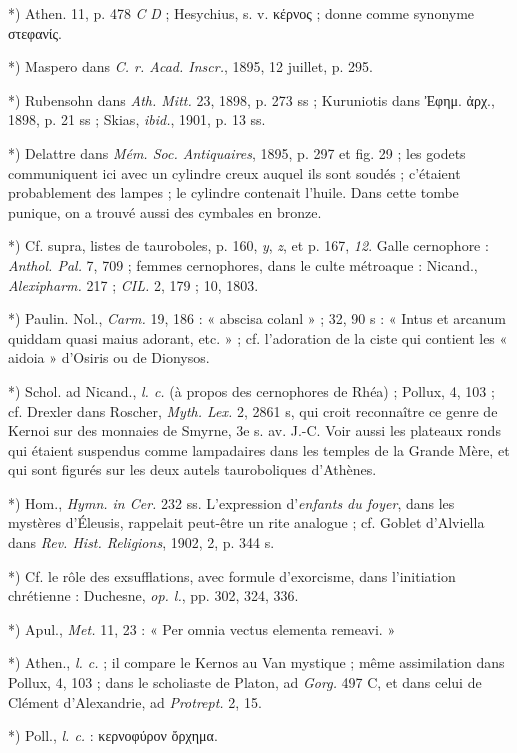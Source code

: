 \documentclass[a4paper, 11pt, oneside, polutonikogreek, french]{article}
\begin{document}
*) Athen. 11, p. 478 \emph{C} \emph{D} ; Hesychius, s. v. κέρνος ; donne comme synonyme στεφανίς.

*) Maspero dans \emph{C. r. Acad. Inscr.}, 1895, 12 juillet, p. 295.

*) Rubensohn dans \emph{Ath. Mitt.} 23, 1898, p. 273 ss ; Kuruniotis dans Ἐφημ. ἀρχ., 1898, p. 21 ss ; Skias, \emph{ibid.}, 1901, p. 13 ss.

*) Delattre dans \emph{Mém. Soc. Antiquaires}, 1895, p. 297 et fig. 29 ; les godets communiquent ici avec un cylindre creux auquel ils sont soudés ; c'étaient probablement des lampes ; le cylindre contenait l'huile. Dans cette tombe punique, on a trouvé aussi des cymbales en bronze.

*) Cf. supra, listes de tauroboles, p. 160, \emph{y}, \emph{z}, et p. 167, \emph{12}. Galle cernophore : \emph{Anthol. Pal.} 7, 709 ; femmes cernophores, dans le culte métroaque : Nicand., \emph{Alexipharm.} 217 ; \emph{CIL.} 2, 179 ; 10, 1803.

*) Paulin. Nol., \emph{Carm.} 19, 186 : « abscisa colanl » ; 32, 90 s : « Intus et arcanum quiddam quasi maius adorant, etc. » ; cf. l'adoration de la ciste qui contient les « aidoia » d'Osiris ou de Dionysos.

*) Schol. ad Nicand., \emph{l. c.} (à propos des cernophores de Rhéa) ; Pollux, 4, 103 ; cf. Drexler dans Roscher, \emph{Myth. Lex.} 2, 2861 s, qui croit reconnaître ce genre de Kernoi sur des monnaies de Smyrne, 3e s. av. J.-C. Voir aussi les plateaux ronds qui étaient suspendus comme lampadaires dans les temples de la Grande Mère, et qui sont figurés sur les deux autels tauroboliques d'Athènes.

*) Hom., \emph{Hymn. in Cer.} 232 ss. L'expression d'\emph{enfants du foyer}, dans les mystères d'Éleusis, rappelait peut-être un rite analogue ; cf. Goblet d'Alviella dans \emph{Rev. Hist. Religions}, 1902, 2, p. 344 s.

*) Cf. le rôle des exsufflations, avec formule d'exorcisme, dans l'initiation chrétienne : Duchesne, \emph{op. l.}, pp. 302, 324, 336.

*) Apul., \emph{Met.} 11, 23 : « Per omnia vectus elementa remeavi. »

*) Athen., \emph{l. c.} ; il compare le Kernos au Van mystique ; même assimilation dans Pollux, 4, 103 ; dans le scholiaste de Platon, ad \emph{Gorg.} 497 C, et dans celui de Clément d'Alexandrie, ad \emph{Protrept.} 2, 15.

*) Poll., \emph{l. c.} : κερνοφύρον ὄρχημα.
\end{document}
